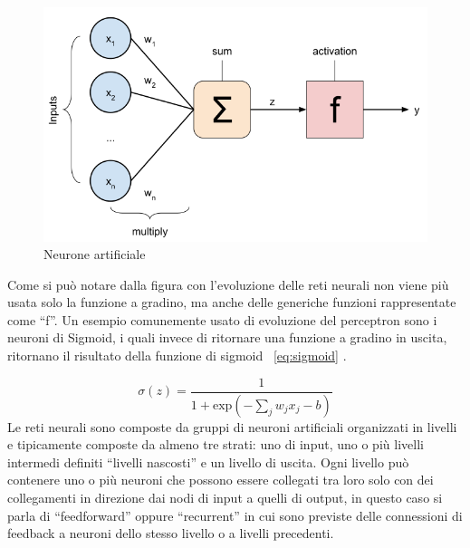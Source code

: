 \begin{figure}[h]
    \label{fig:neurone}
    \includegraphics[width=\hsize]{images/reti_neurali/neurone.png}
    \caption{Neurone artificiale}
    \centering
\end{figure}

Come si può notare dalla figura con l'evoluzione delle reti neurali non viene più usata solo la funzione a gradino, ma anche delle generiche funzioni rappresentate come ``f''.
Un esempio comunemente usato di evoluzione del perceptron sono i neuroni di Sigmoid, i quali invece di ritornare una funzione a gradino in uscita, ritornano il risultato della funzione di sigmoid ~\ref{eq:sigmoid} \cite{reti_neurali_libro}.

\begin{equation}
    \label{eq:sigmoid}
    \sigma(z) = \frac{1}{1+\mbox{exp}(-\sum_{j}{w_{j}x_{j}} - b)}
\end{equation}
Le reti neurali sono composte da gruppi di neuroni artificiali organizzati in livelli e tipicamente composte da almeno tre strati: uno di input, uno o più livelli intermedi definiti ``livelli nascosti'' e un livello di uscita. Ogni livello può contenere uno o più neuroni che possono essere collegati tra loro solo con dei collegamenti in direzione dai nodi di input a quelli di output, in questo caso si parla di ``feedforward'' oppure ``recurrent'' in cui sono previste delle connessioni di feedback a neuroni dello stesso livello o a livelli precedenti.
% 

